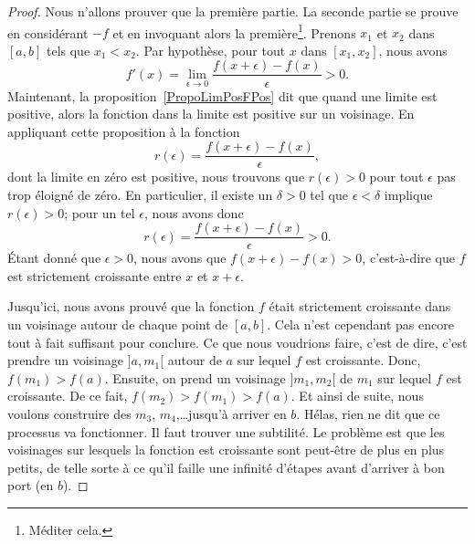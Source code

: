 \begin{proof}
    Nous n'allons prouver que la première partie. La seconde partie se prouve en considérant $-f$ et en invoquant alors la première\footnote{Méditer cela.}. Prenons $x_1$ et $x_2$ dans $[a,b]$ tels que $x_1<x_2$. Par hypothèse, pour tout $x$ dans $[x_1,x_2]$, nous avons
    \begin{equation}
        f'(x)=\lim_{\epsilon\to 0}\frac{ f(x+\epsilon)-f(x) }{\epsilon} >0.
    \end{equation}
    Maintenant, la proposition~\ref{PropoLimPosFPos} dit que quand une limite est positive, alors la fonction dans la limite est positive sur un voisinage. En appliquant cette proposition à la fonction
    \begin{equation}
        r(\epsilon)=\frac{ f(x+\epsilon)-f(x) }{ \epsilon },
    \end{equation}
    dont la limite en zéro est positive, nous trouvons que $r(\epsilon)>0$ pour tout $\epsilon$ pas trop éloigné de zéro. En particulier, il existe un $\delta>0$ tel que $\epsilon<\delta$ implique $r(\epsilon)>0$; pour un tel $\epsilon$, nous avons donc
    \begin{equation}
        r(\epsilon)=\frac{ f(x+\epsilon)-f(x) }{ \epsilon }>0.
    \end{equation}
    Étant donné que $\epsilon>0$, nous avons que $f(x+\epsilon)-f(x)>0$, c'est-à-dire que $f$ est strictement croissante entre $x$ et $x+\epsilon$.

    Jusqu'ici, nous avons prouvé que la fonction $f$ était strictement croissante dans un voisinage autour de chaque point de $[a,b]$. Cela n'est cependant pas encore tout à fait suffisant pour conclure. Ce que nous voudrions faire, c'est de dire, c'est prendre un voisinage $]a,m_1[$ autour de $a$ sur lequel $f$ est croissante. Donc, $f(m_1)>f(a)$. Ensuite, on prend un voisinage $]m_1,m_2[$ de $m_1$ sur lequel $f$ est croissante. De ce fait, $f(m_2)>f(m_1)>f(a)$. Et ainsi de suite, nous voulons construire des $m_3$, $m_4$,\ldots jusqu'à arriver en $b$. Hélas, rien ne dit que ce processus va fonctionner. Il faut trouver une subtilité. Le problème est que les voisinages sur lesquels la fonction est croissante sont peut-être de plus en plus petits, de telle sorte à ce qu'il faille une infinité d'étapes avant d'arriver à bon port (en $b$).


\end{proof}
